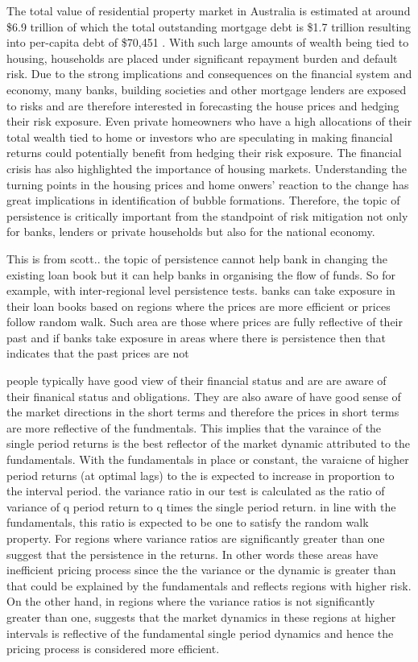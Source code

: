 \documentclass[AEJ,reqno, draftmode]{AEA}
\begin{document}
The total value of residential property market in Australia is estimated at around \$6.9 trillion of which the total outstanding mortgage debt is \$1.7 trillion resulting into per-capita debt of \$70,451 \citet{abs}. With such large amounts of wealth being tied to housing, households are placed under significant repayment burden and default risk. Due to the strong implications and consequences on the financial system and economy, many banks, building societies and other mortgage lenders are exposed to risks and are therefore interested in forecasting the house prices and hedging their risk exposure. Even private homeowners who have a high allocations of their total wealth tied to home or investors who are speculating in making financial returns could potentially benefit from hedging their risk exposure. The financial crisis has also highlighted the importance of housing markets. Understanding the turning points in the housing prices and home onwers' reaction to the change has great implications in identification of bubble formations. Therefore, the topic of persistence is critically important from the standpoint of risk mitigation not only for banks, lenders or private households but also for the national economy. 

This is from scott.. the topic of persistence cannot help bank in changing the existing loan book but it can help banks in organising the flow of funds. So for example, with inter-regional level persistence  tests. banks can take exposure in their loan books based on regions where the prices are more efficient or prices follow random walk. Such area are those where prices are fully reflective of their past and  if banks take exposure in areas where there is persistence then that indicates that the past prices are not 

people typically have good view of their financial status and are are aware of their finanical status and obligations. They are also aware of have good sense of the market directions in the short terms and therefore the prices in short terms are more reflective of the fundmentals. This implies that the varaince of the single period returns is the best reflector of the market dynamic attributed to the fundamentals. With the fundamentals in place or constant, the varaicne of higher period returns (at optimal lags) to the is expected to increase in proportion to the interval period. the variance ratio in our test is calculated as the ratio of variance of q period return to q times the single period return. in line with the fundamentals, this ratio is expected to be one to satisfy the random walk property. For regions where variance ratios are significantly greater than one suggest that the persistence in the returns. In other words these areas have inefficient pricing process since the the variance or the dynamic is greater than that could be explained by the fundamentals and reflects regions with higher risk. On the other hand, in regions where the variance ratios is not significantly greater than one, suggests that the market dynamics in these regions at higher intervals is reflective of the fundamental single period dynamics and hence the pricing process is considered more efficient.
\end{document}
